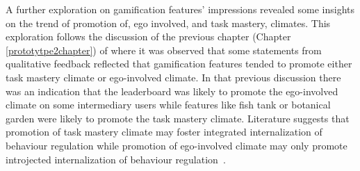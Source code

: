 A further exploration on  gamification features' impressions revealed some insights on the trend of promotion of, ego involved, and task mastery, climates. This exploration follows the discussion of the previous chapter (Chapter \ref{prototytpe2chapter}) of where it was observed that some statements from qualitative feedback reflected that gamification features tended to promote either task mastery climate or ego-involved climate. In that previous discussion there was an indication that the leaderboard was likely to promote the ego-involved climate on some intermediary users while features like fish tank or botanical garden were likely to promote the task mastery climate. Literature suggests that promotion of task mastery climate may foster integrated internalization of behaviour regulation while promotion of ego-involved climate may only promote introjected internalization of behaviour regulation~\citep{saksono2015spaceship}.

